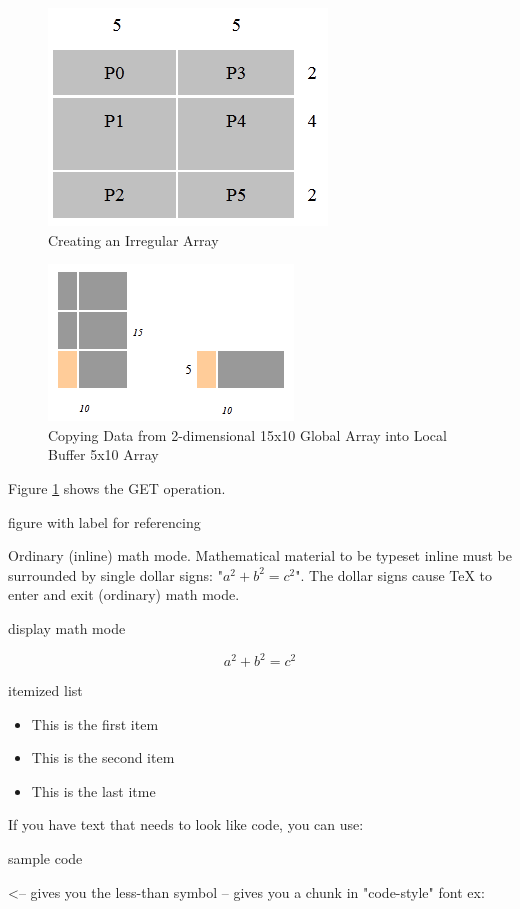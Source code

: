 \begin{figure}
\centering
\includegraphics{CrIrreg}
\caption{Creating an Irregular Array}
\end{figure}


\begin{figure}
\centering
\includegraphics{GET}
\caption{Copying Data from 2-dimensional 15x10 Global Array into Local Buffer 5x10 Array}
\label{get}
\end{figure}

Figure \ref{get} shows the GET operation.

figure with label for referencing

Ordinary (inline) math mode. Mathematical material to be typeset inline must be surrounded by single dollar signs: "$a^2 + b^2 = c^2$". The dollar signs cause TeX to enter and exit (ordinary) math mode. 

display math mode

\[
a^2 + b^2 = c^2
\]


itemized list

\begin{itemize}
\item This is the first item
\item This is the second item
\item This is the last itme
\end{itemize}

If you have text that needs to look like code, you can use:

\begin{codeseg}
sample code
\end{codeseg}

\textless   -- gives you the less-than symbol
\codevar    -- gives you a chunk in "code-style" font ex:
